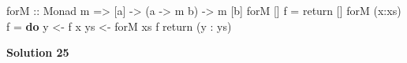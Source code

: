 \documentclass[11pt,
  american,
  DIV13]{article}
\newenvironment{Shaded}{}{}
\newcommand{\DataTypeTok}[1]{\textcolor[rgb]{0.56,0.13,0.00}{#1}}
\newcommand{\FunctionTok}[1]{\textcolor[rgb]{0.02,0.16,0.49}{#1}}
\newcommand{\KeywordTok}[1]{\textcolor[rgb]{0.00,0.44,0.13}{\textbf{#1}}}
\newcommand{\NormalTok}[1]{#1}
\newcommand{\OperatorTok}[1]{\textcolor[rgb]{0.40,0.40,0.40}{#1}}
\newcommand{\OtherTok}[1]{\textcolor[rgb]{0.00,0.44,0.13}{#1}}
\begin{document}
\begin{Shaded}
\begin{Highlighting}[]
\OtherTok{forM ::} \DataTypeTok{Monad}\NormalTok{ m }\OtherTok{=\textgreater{}}\NormalTok{ [a] }\OtherTok{{-}\textgreater{}}\NormalTok{ (a }\OtherTok{{-}\textgreater{}}\NormalTok{ m b) }\OtherTok{{-}\textgreater{}}\NormalTok{ m [b]}
\NormalTok{forM [] f }\OtherTok{=} \FunctionTok{return}\NormalTok{ []}
\NormalTok{forM (x}\OperatorTok{:}\NormalTok{xs) f }\OtherTok{=} \KeywordTok{do}
\NormalTok{    y }\OtherTok{\textless{}{-}}\NormalTok{ f x}
\NormalTok{    ys }\OtherTok{\textless{}{-}}\NormalTok{ forM xs f}
    \FunctionTok{return}\NormalTok{ (y }\OperatorTok{:}\NormalTok{ ys)}
\end{Highlighting}
\end{Shaded}

\textbf{Solution 25}
\end{document}

